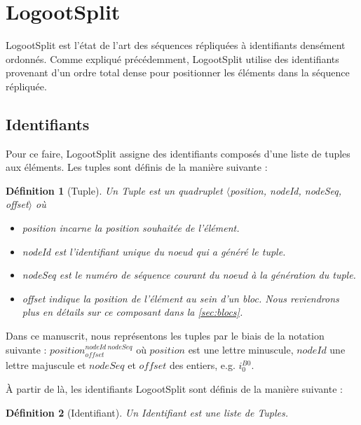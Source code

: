 \documentclass[12pt]{thesul}
\newtheorem{definition}{Définition}
\newcommand{\eg}{e.g. }
\newcommand{\trm}[1]{\mathit{#1}}
\newcommand{\id}[3]{$\trm{#1}^{\trm{#2}}_{\trm{#3}}$}
\begin{document}
\section{LogootSplit}

\label{sec:logootsplit}

LogootSplit \cite{2013-logootsplit} est l'état de l'art des séquences répliquées à identifiants densément ordonnés.
Comme expliqué précédemment, LogootSplit utilise des identifiants provenant d'un ordre total dense pour positionner les éléments dans la séquence répliquée.

\subsection{Identifiants}

Pour ce faire, LogootSplit assigne des identifiants composés d'une liste de tuples aux éléments.
Les tuples sont définis de la manière suivante :

\begin{definition}[Tuple]
  Un \emph{Tuple} est un quadruplet $\langle$position, nodeId, nodeSeq, offset$\rangle$ où
  \begin{itemize}
    \item position incarne la position souhaitée de l'élément.
    \item nodeId est l'identifiant unique du noeud qui a généré le tuple.
    \item nodeSeq est le numéro de séquence courant du noeud à la génération du tuple.
    \item offset indique la position de l'élément au sein d'un bloc. Nous reviendrons plus en détails sur ce composant dans la \autoref{sec:blocs}.
  \end{itemize}
\end{definition}


Dans ce manuscrit, nous représentons les tuples par le biais de la notation suivante : \id{position}{nodeId~nodeSeq}{offset} où $\trm{position}$ est une lettre minuscule, $\trm{nodeId}$ une lettre majuscule et $\trm{nodeSeq}$ et $\trm{offset}$ des entiers, \eg \id{i}{B0}{0}.

À partir de là, les identifiants LogootSplit sont définis de la manière suivante :

\begin{definition}[Identifiant]
  Un \emph{Identifiant} est une liste de \emph{Tuples}.
\end{definition}
\end{document}
